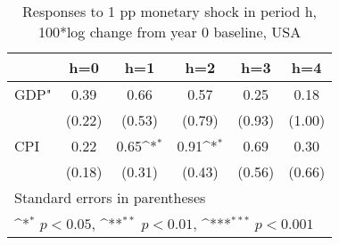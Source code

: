 \begin{table}[htbp]\centering
\def\sym#1{\ifmmode^{#1}\else\(^{#1}\)\fi}
\caption{Responses to 1 pp monetary shock in period h, 100*log change from year 0 baseline, USA}
\begin{tabular}{l*{5}{c}}
\hline\hline
            &\multicolumn{1}{c}{h=0}&\multicolumn{1}{c}{h=1}&\multicolumn{1}{c}{h=2}&\multicolumn{1}{c}{h=3}&\multicolumn{1}{c}{h=4}\\
\hline
GDP"        &        0.39         &        0.66         &        0.57         &        0.25         &        0.18         \\
            &      (0.22)         &      (0.53)         &      (0.79)         &      (0.93)         &      (1.00)         \\
[1em]
CPI         &        0.22         &        0.65\sym{*}  &        0.91\sym{*}  &        0.69         &        0.30         \\
            &      (0.18)         &      (0.31)         &      (0.43)         &      (0.56)         &      (0.66)         \\
\hline\hline
\multicolumn{6}{l}{\footnotesize Standard errors in parentheses}\\
\multicolumn{6}{l}{\footnotesize \sym{*} \(p<0.05\), \sym{**} \(p<0.01\), \sym{***} \(p<0.001\)}\\
\end{tabular}
\end{table}
